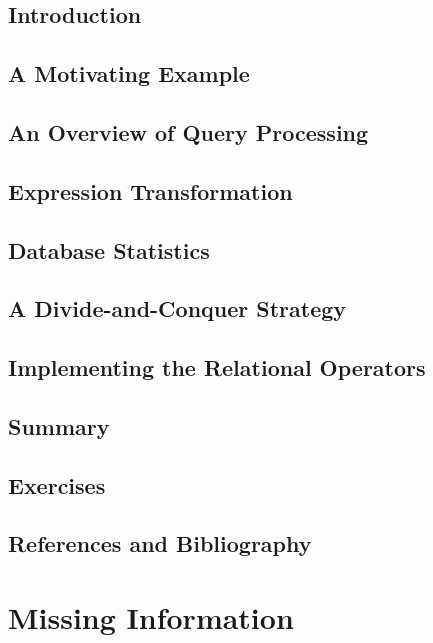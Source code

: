 \documentclass{book}
\begin{document}
\section{Introduction}

\section{A Motivating Example}

\section{An Overview of Query Processing}

\section{Expression Transformation}

\section{Database Statistics}

\section{A Divide-and-Conquer Strategy}

\section{Implementing the Relational Operators}

\section{Summary}

\section{Exercises}

\section{References and Bibliography}













\chapter{Missing Information}
\end{document}
